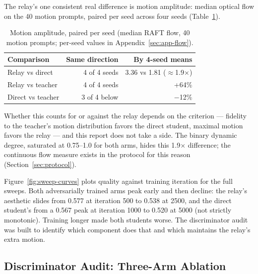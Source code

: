 \documentclass[11pt,a4paper]{article}
\begin{document}
The relay's one consistent real difference is motion amplitude: median optical flow \cite{raft} on the 40 motion prompts, paired per seed across four seeds (Table~\ref{tab:flowdir}).

\begin{table}[htbp]
  \centering
  \begin{tabular}{lrr}
    \toprule
    Comparison & Same direction & By 4-seed means \\
    \midrule
    Relay vs direct & 4 of 4 seeds & 3.36 vs 1.81 ($\approx$1.9$\times$) \\
    Relay vs teacher & 4 of 4 seeds & +64\% \\
    Direct vs teacher & 3 of 4 below & $-$12\% \\
    \bottomrule
  \end{tabular}
  \caption{Motion amplitude, paired per seed (median RAFT flow, 40 motion prompts; per-seed values in Appendix~\ref{sec:app-flow}).}
  \label{tab:flowdir}
\end{table}

Whether this counts for or against the relay depends on the criterion — fidelity to the teacher's motion distribution favors the direct student, maximal motion favors the relay — and this report does not take a side. The binary dynamic degree, saturated at 0.75–1.0 for both arms, hides this 1.9$\times$ difference; the continuous flow measure exists in the protocol for this reason (Section~\ref{sec:protocol}).

Figure~\ref{fig:sweep-curves} plots quality against training iteration for the full sweeps. Both adversarially trained arms peak early and then decline: the relay's aesthetic slides from 0.577 at iteration 500 to 0.538 at 2500, and the direct student's from a 0.567 peak at iteration 1000 to 0.520 at 5000 (not strictly monotonic). Training longer made both students worse. The discriminator audit was built to identify which component does that and which maintains the relay's extra motion.

\subsection{Discriminator Audit: Three-Arm Ablation}\label{sec:exp-audit}
\end{document}
